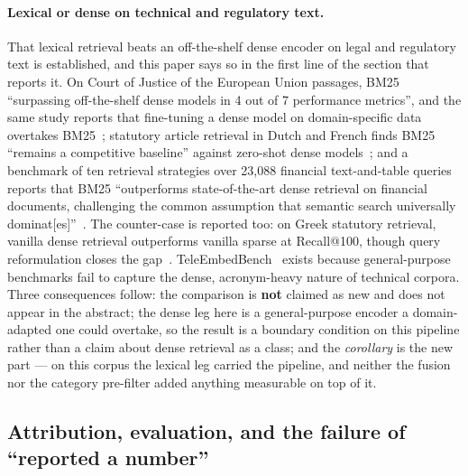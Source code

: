 \documentclass[conference]{IEEEtran}
\begin{document}
\paragraph{Lexical or dense on technical and regulatory text.} That lexical
retrieval beats an off-the-shelf dense encoder on legal and regulatory text
is established, and this paper says so in the first line of the section that
reports it. On Court of Justice of the European Union passages, BM25
``surpassing off-the-shelf dense models in 4 out of 7 performance metrics'',
and the same study reports that fine-tuning a dense model on domain-specific
data overtakes BM25~\cite{mori2025lexical}; statutory article retrieval in
Dutch and French finds BM25 ``remains a competitive baseline'' against
zero-shot dense models~\cite{lotfi2024bsard}; and a benchmark of ten
retrieval strategies over 23{,}088 financial text-and-table queries reports
that BM25 ``outperforms state-of-the-art dense retrieval on financial
documents, challenging the common assumption that semantic search universally
dominat[es]''~\cite{akarsu2026bm25}. The counter-case is reported too: on
Greek statutory retrieval, vanilla dense retrieval outperforms vanilla sparse
at Recall@100, though query reformulation closes the gap~\cite{beta2026greekbar}.
TeleEmbedBench~\cite{gajjar2026teleembed} exists because general-purpose
benchmarks fail to capture the dense, acronym-heavy nature of technical
corpora. Three consequences follow: the comparison is \textbf{not} claimed as
new and does not appear in the abstract; the dense leg here is a
general-purpose encoder a domain-adapted one could overtake, so the result is
a boundary condition on this pipeline rather than a claim about dense
retrieval as a class; and the \emph{corollary} is the new part --- on this
corpus the lexical leg carried the pipeline, and neither the fusion nor the
category pre-filter added anything measurable on top of it.

\subsection{Attribution, evaluation, and the failure of ``reported a number''}
\end{document}

